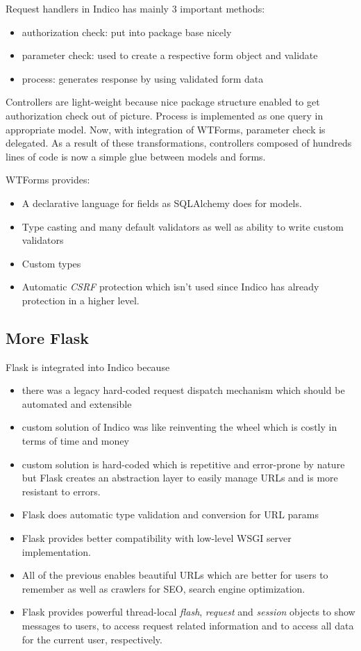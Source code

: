 Request handlers in Indico has mainly 3 important methods:
\begin{itemize}
  \item authorization check: put into package base nicely
  \item parameter check: used to create a respective form object and validate
  \item process: generates response by using validated form data
\end{itemize}

Controllers are light-weight because nice package structure enabled to get authorization check out of picture. Process is implemented as one query in appropriate model. Now, with integration of WTForms, parameter check is delegated. As a result of these transformations, controllers composed of hundreds lines of code is now a simple glue between models and forms.

WTForms provides:
\begin{itemize}
  \item A declarative language for fields as SQLAlchemy does for models.
  \item Type casting and many default validators as well as ability to write custom validators
  \item Custom types
  \item Automatic \textit{CSRF} protection which isn't used since Indico has already protection in a higher level.
\end{itemize}

\subsection{More Flask}

Flask is integrated into Indico because
\begin{itemize}
  \item there was a legacy hard-coded request dispatch mechanism which should be automated and extensible
  \item custom solution of Indico was like reinventing the wheel which is costly in terms of time and money
  \item custom solution is hard-coded which is repetitive and error-prone by nature but Flask creates an abstraction layer to easily manage URLs and is more resistant to errors.
  \item Flask does automatic type validation and conversion for URL params
  \item Flask provides better compatibility with low-level WSGI server implementation.
  \item All of the previous enables beautiful URLs which are better for users to remember as well as crawlers for SEO, search engine optimization.
  \item Flask provides powerful thread-local \textit{flash}, \textit{request} and \textit{session} objects to show messages to users, to access request related information and to access all data for the current user, respectively. 
\end{itemize}


